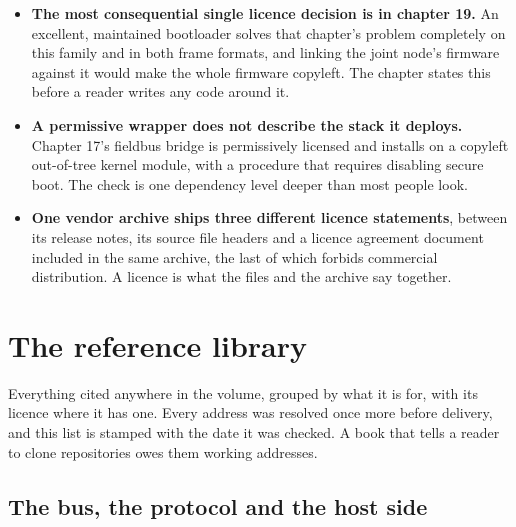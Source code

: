 \begin{itemize}[itemsep=3pt]
\item \textbf{The most consequential single licence decision is in chapter 19.}
An excellent, maintained bootloader solves that chapter's problem completely on
this family and in both frame formats, and linking the joint node's firmware
against it would make the whole firmware copyleft. The chapter states this
before a reader writes any code around it.
\item \textbf{A permissive wrapper does not describe the stack it deploys.}
Chapter 17's fieldbus bridge is permissively licensed and installs on a
copyleft out-of-tree kernel module, with a procedure that requires disabling
secure boot. The check is one dependency level deeper than most people look.
\item \textbf{One vendor archive ships three different licence statements},
between its release notes, its source file headers and a licence agreement
document included in the same archive, the last of which forbids commercial
distribution. A licence is what the files and the archive say together.
\end{itemize}

\section{The reference library}

Everything cited anywhere in the volume, grouped by what it is for, with its
licence where it has one. Every address was resolved once more before delivery,
and this list is stamped with the date it was checked. A book that tells a
reader to clone repositories owes them working addresses.

\subsection*{The bus, the protocol and the host side}


